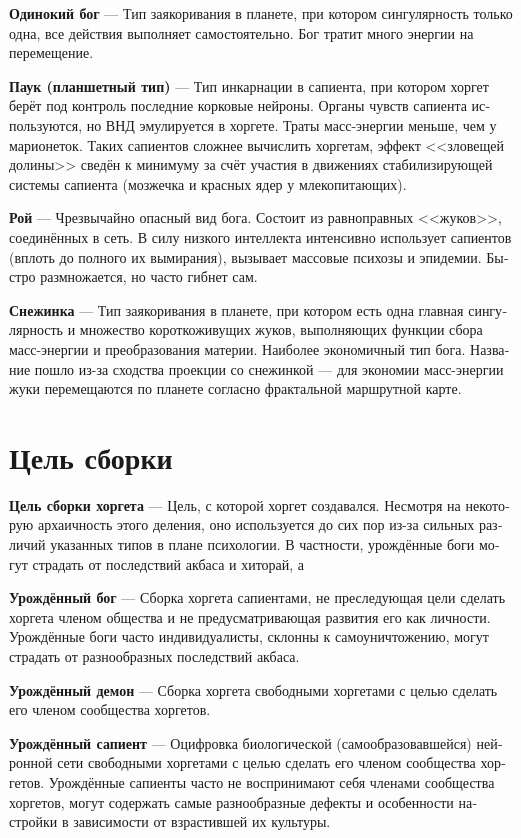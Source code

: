 \documentclass[a4paper,12pt,fleqn]{book}\usepackage{cooltooltips}\usepackage{polyglossia}\setdefaultlanguage[babelshorthands=true]{russian}\setotherlanguage{english}\defaultfontfeatures{Ligatures=TeX,Mapping=tex-text} \usepackage{xcolor}\definecolor{lightgray}{HTML}{bbbbbb}\color{lightgray}\newcommand{\ml}[3]{\textenglish{\textcolor{black}{#3}}}
\newcommand{\asterism}{\vspace{1em}{\centering\Large\bfseries$\ast~\ast~\ast$\par}\vspace{1em}}
\newcommand{\theterm}[3]{\textbf{\hypertarget{#1}{#2}} --- #3}
\begin{document}
\theterm{lonely-god}
{Одинокий бог}
{Тип заякоривания в планете, при котором сингулярность только одна, все действия выполняет самостоятельно.
Бог тратит много энергии на перемещение.}

\theterm{spider}
{Паук (планшетный тип)}
{Тип инкарнации в сапиента, при котором хоргет берёт под контроль последние корковые нейроны.
Органы чувств сапиента используются, но ВНД эмулируется в хоргете.
Траты масс-энергии меньше, чем у марионеток.
Таких сапиентов сложнее вычислить хоргетам, эффект <<зловещей долины>> сведён к минимуму за счёт участия в движениях стабилизирующей системы сапиента (мозжечка и красных ядер у млекопитающих).}

\theterm{swarm}
{Рой}
{Чрезвычайно опасный вид бога.
Состоит из равноправных <<жуков>>, соединённых в сеть.
В силу низкого интеллекта интенсивно использует сапиентов (вплоть до полного их вымирания), вызывает массовые психозы и эпидемии.
Быстро размножается, но часто гибнет сам.}

\theterm{snowflake}
{Снежинка}
{Тип заякоривания в планете, при котором есть одна главная сингулярность и множество короткоживущих жуков, выполняющих функции сбора масс-энергии и преобразования материи.
Наиболее экономичный тип бога.
Название пошло из-за сходства проекции со снежинкой --- для экономии масс-энергии жуки перемещаются по планете согласно фрактальной маршрутной карте.}

\section{Цель сборки}

\theterm{compilation-purpose}
{Цель сборки хоргета}
{Цель, с которой хоргет создавался.
Несмотря на некоторую архаичность этого деления, оно используется до сих пор из-за сильных различий указанных типов в плане психологии.
В частности, урождённые боги могут страдать от последствий акбаса и хиторай, а }

\asterism

\theterm{born-god}
{Урождённый бог}
{Сборка хоргета сапиентами, не преследующая цели сделать хоргета членом общества и не предусматривающая развития его как личности.
Урождённые боги часто индивидуалисты, склонны к самоуничтожению, могут страдать от разнообразных последствий акбаса.}

\theterm{born-daemon}
{Урождённый демон}
{Сборка хоргета свободными хоргетами с целью сделать его членом сообщества хоргетов.}

\theterm{born-sapient}
{Урождённый сапиент}
{Оцифровка биологической (самообразовавшейся) нейронной сети свободными хоргетами с целью сделать его членом сообщества хоргетов.
Урождённые сапиенты часто не воспринимают себя членами сообщества хоргетов, могут содержать самые разнообразные дефекты и особенности настройки в зависимости от взрастившей их культуры.}
\end{document}
